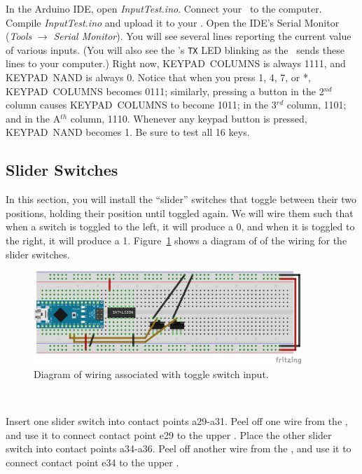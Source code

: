 
In the Arduino IDE, open \textit{InputTest.ino}. Connect your \nano\ to the
computer. Compile \textit{InputTest.ino} and upload it to your \nano. Open the
IDE's Serial Monitor (\textit{Tools} $\rightarrow$ \textit{Serial Monitor}).
You will see several lines reporting the current value of various inputs. (You
will also see the \nano's \texttt{TX} LED blinking as the \nano\ sends these
lines to your computer.) Right now, KEYPAD~COLUMNS is always 1111, and
KEYPAD~NAND is always 0. Notice that when you press 1, 4, 7, or *,
KEYPAD~COLUMNS becomes 0111; similarly, pressing a button in the 2$^{nd}$
column causes KEYPAD~COLUMNS to become 1011; in the 3$^{rd}$ column, 1101; and
in the A$^{th}$ column, 1110. Whenever any keypad button is pressed,
KEYPAD~NAND becomes 1. Be sure to test all 16 keys.

\subsection{Slider Switches}

In this section, you will install the ``slider'' switches that toggle between
their two positions, holding their position until toggled again. We will wire
them such that when a switch is toggled to the left, it will produce a 0, and
when it is toggled to the right, it will produce a 1.
Figure~\ref{fig:switch-diagram} shows a diagram of of the wiring for the
slider switches.

\begin{figure}[p]
    \centering
    \includegraphics[width=0.9\textwidth]{fritzing_images/switch}
    \caption{Diagram of wiring associated with toggle switch input.
        \label{fig:switch-diagram}}
\end{figure}

\disconnect\

Insert one slider switch into contact points a29-a31. Peel off one wire from
the \rainbow, and use it to connect contact point e29 to the upper \ground.
Place the other slider switch into contact points a34-a36. Peel off another
wire from the \rainbow, and use it to connect contact point e34 to the upper
\ground. %


